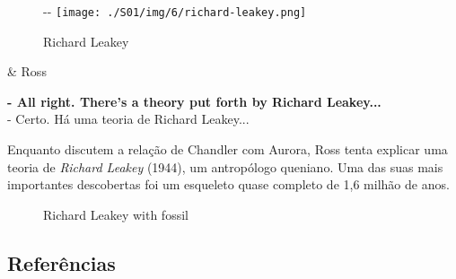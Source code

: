 \begin{figure}[!ht]
  \begin{adjustwidth}{-\oddsidemargin-1in}{-\rightmargin}
    \centering
    \texttt{[image: ./S01/img/6/richard-leakey.png]}
    \caption{Richard Leakey\label{fig:richard-leakey}}
  \end{adjustwidth}
\end{figure}

\begin{tcolorbox}[enhanced,center upper,
    drop fuzzy shadow southeast, boxrule=0.3pt,
    lower separated=false,
    colframe=black!30!dialogoBorder,colback=white]
\begin{minipage}[c]{0.16\linewidth}
   & \centering \scriptsize{Ross}
\end{minipage}
\hfill
\begin{minipage}[c]{0.8\linewidth}
  \textbf{- All right. There's a theory put forth by Richard Leakey...}\\
  - Certo. Há uma teoria de Richard Leakey...
\end{minipage}
\end{tcolorbox}

Enquanto discutem a relação de Chandler com Aurora, Ross tenta explicar
uma teoria de \emph{Richard Leakey} (1944), um antropólogo queniano. Uma
das suas mais importantes descobertas foi um esqueleto quase completo de
1,6 milhão de anos.

\begin{figure}
  \centering
    \caption{Richard Leakey with fossil\label{fig:richard-leakey-with-fossil}}
\end{figure}

\hypertarget{referuxeancias-1}{%
\subsection{Referências}\label{referuxeancias-1}}


